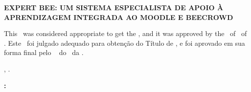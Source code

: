 


\begin{folhadeaprovacao}

    \begin{center}
        {\imprimirautor}

        \begin{center}
            \ABNTEXchapterfont\bfseries\MakeUppercase{Expert Bee: Um Sistema Especialista de Apoio à Aprendizagem Integrada ao Moodle e Beecrowd}\ifnotempty{\imprimirsubtitulo}{: \imprimirsubtitulo}
        \end{center}

        \begin{minipage}{\textwidth}
            \lang
            {
                This \imprimirtipotrabalho~was considered appropriate to get the \imprimirformacao,
                and it was approved by the \imprimirprograma~of \imprimircentro~of \imprimirinstituicao.
            }
            {
                Este \imprimirtipotrabalho~foi julgado adequado para obtenção do Título de \imprimirformacao,
                e foi aprovado em sua forma final pelo \imprimirprograma~
                do \imprimircentro~da \imprimirinstituicao.
            }
         \end{minipage}%
    \end{center}

    \begin{center}
        \imprimirlocal, \imprimirdata.
    \end{center}


    \begin{flushleft}
        \textbf{:}
    \end{flushleft}

    \begin{center}
        \assinatura{%
            \textbf{\imprimirorientador} \\ \imprimirorientadorRotulo\\
            \imprimirinstituicao
        }


\end{center}
\end{folhadeaprovacao}
